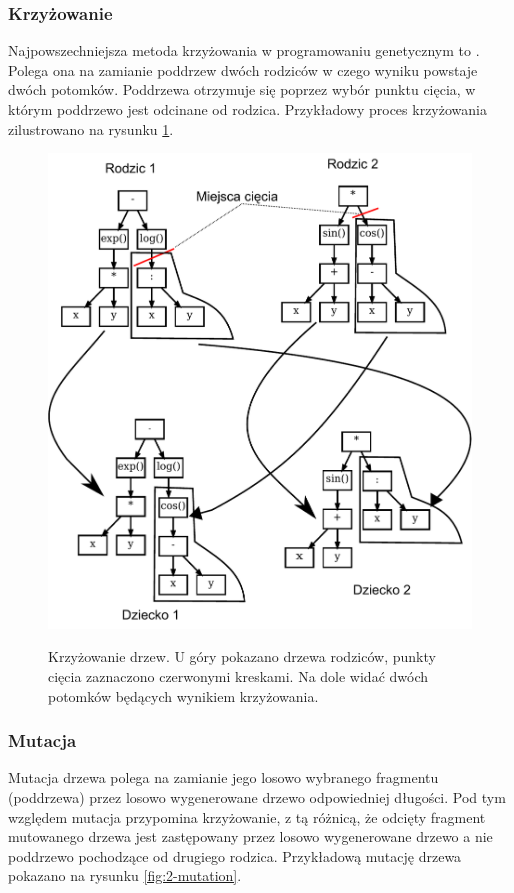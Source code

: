 \subsubsection{Krzyżowanie}
Najpowszechniejsza metoda krzyżowania w programowaniu genetycznym to . Polega ona na zamianie poddrzew dwóch rodziców w czego wyniku powstaje dwóch potomków. Poddrzewa otrzymuje się poprzez wybór punktu cięcia, w którym poddrzewo jest odcinane od rodzica. Przykładowy proces krzyżowania zilustrowano na rysunku \ref{fig:2-cross}.

\begin{figure}[h]
\centering
\includegraphics[scale=0.8]{figures/graphs/2-cross-both}
\label{fig:2-cross}
\caption{Krzyżowanie drzew. U góry pokazano drzewa rodziców, punkty cięcia zaznaczono czerwonymi kreskami. Na dole widać dwóch potomków będących wynikiem krzyżowania.}
\end{figure}

\subsubsection{Mutacja}
Mutacja drzewa polega na zamianie jego losowo wybranego fragmentu (poddrzewa) przez losowo wygenerowane drzewo odpowiedniej długości. Pod tym względem mutacja przypomina krzyżowanie, z tą różnicą, że odcięty fragment mutowanego drzewa jest zastępowany przez losowo wygenerowane drzewo a nie poddrzewo pochodzące od drugiego rodzica. Przykładową mutację drzewa pokazano na rysunku \ref{fig:2-mutation}.

